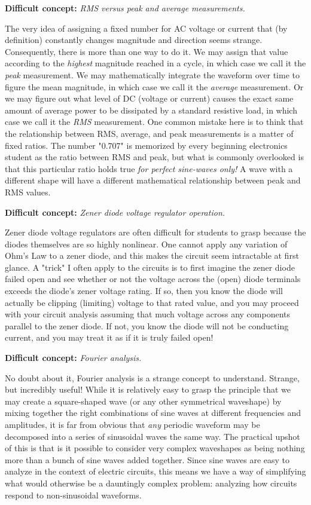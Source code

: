 \vskip 10pt

\noindent
{\bf Difficult concept: } {\it RMS versus peak and average measurements.}

The very idea of assigning a fixed number for AC voltage or current that (by definition) constantly changes magnitude and direction seems strange.  Consequently, there is more than one way to do it.  We may assign that value according to the {\it highest} magnitude reached in a cycle, in which case we call it the {\it peak} measurement.  We may mathematically integrate the waveform over time to figure the mean magnitude, in which case we call it the {\it average} measurement.  Or we may figure out what level of DC (voltage or current) causes the exact same amount of average power to be dissipated by a standard resistive load, in which case we call it the {\it RMS} measurement.  One common mistake here is to think that the relationship between RMS, average, and peak measurements is a matter of fixed ratios.  The number "0.707" is memorized by every beginning electronics student as the ratio between RMS and peak, but what is commonly overlooked is that this particular ratio holds true {\it for perfect sine-waves only!}  A wave with a different shape will have a different mathematical relationship between peak and RMS values.

\vskip 10pt

\noindent
{\bf Difficult concept: } {\it Zener diode voltage regulator operation.}

Zener diode voltage regulators are often difficult for students to grasp because the diodes themselves are so highly nonlinear.  One cannot apply any variation of Ohm's Law to a zener diode, and this makes the circuit seem intractable at first glance.  A "trick" I often apply to the circuits is to first imagine the zener diode failed open and see whether or not the voltage across the (open) diode terminals exceeds the diode's zener voltage rating.  If so, then you know the diode will actually be clipping (limiting) voltage to that rated value, and you may proceed with your circuit analysis assuming that much voltage across any components parallel to the zener diode.  If not, you know the diode will not be conducting current, and you may treat it as if it is truly failed open!

\vskip 10pt

\noindent
{\bf Difficult concept: } {\it Fourier analysis.}

No doubt about it, Fourier analysis is a strange concept to understand.  Strange, but incredibly useful!  While it is relatively easy to grasp the principle that we may create a square-shaped wave (or any other symmetrical waveshape) by mixing together the right combinations of sine waves at different frequencies and amplitudes, it is far from obvious that {\it any} periodic waveform may be decomposed into a series of sinusoidal waves the same way.  The practical upshot of this is that is it possible to consider very complex waveshapes as being nothing more than a bunch of sine waves added together.  Since sine waves are easy to analyze in the context of electric circuits, this means we have a way of simplifying what would otherwise be a dauntingly complex problem: analyzing how circuits respond to non-sinusoidal waveforms.

